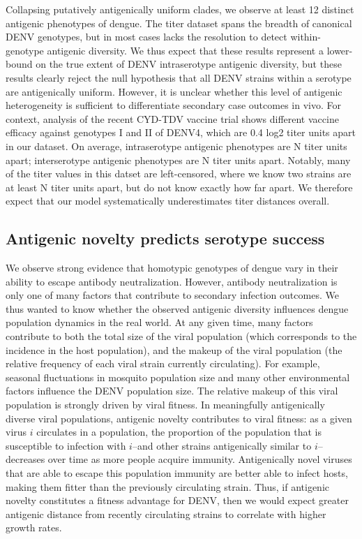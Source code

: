 \documentclass[11pt,oneside,letterpaper]{article}
\begin{document}
Collapsing putatively antigenically uniform clades, we observe at least 12 distinct antigenic phenotypes of dengue.
The titer dataset spans the breadth of canonical DENV genotypes, but in most cases lacks the resolution to detect within-genotype antigenic diversity.
We thus expect that these results represent a lower-bound on the true extent of DENV intraserotype antigenic diversity, but these results clearly reject the null hypothesis that all DENV strains within a serotype are antigenically uniform.
However, it is unclear whether this level of antigenic heterogeneity is sufficient to differentiate secondary case outcomes in vivo.
For context, analysis of the recent CYD-TDV vaccine trial shows different vaccine efficacy against genotypes I and II of DENV4, which are 0.4 log2 titer units apart in our dataset.
On average, intraserotype antigenic phenotypes are N titer units apart; interserotype antigenic phenotypes are N titer units apart.
Notably, many of the titer values in this datset are left-censored, where we know two strains are at least N titer units apart, but do not know exactly how far apart.
We therefore expect that our model systematically underestimates titer distances overall.

\subsection{Antigenic novelty predicts serotype success}
We observe strong evidence that homotypic genotypes of dengue vary in their ability to escape antibody neutralization.
However, antibody neutralization is only one of many factors that contribute to secondary infection outcomes.
We thus wanted to know whether the observed antigenic diversity influences dengue population dynamics in the real world.
At any given time, many factors contribute to both the total size of the viral population (which corresponds to the incidence in the host population), and the makeup of the viral population (the relative frequency of each viral strain currently circulating).
For example, seasonal fluctuations in mosquito population size and many other environmental factors influence the DENV population size.
The relative makeup of this viral population is strongly driven by viral fitness.
In meaningfully antigenically diverse viral populations, antigenic novelty contributes to viral fitness: as a given virus $i$ circulates in a population, the proportion of the population that is susceptible to infection with $i$--and other strains antigenically similar to $i$--decreases over time as more people acquire immunity.
Antigenically novel viruses that are able to escape this population immunity are better able to infect hosts, making them fitter than the previously circulating strain.
Thus, if antigenic novelty constitutes a fitness advantage for DENV, then we would expect greater antigenic distance from recently circulating strains to correlate with higher growth rates.
\end{document}
